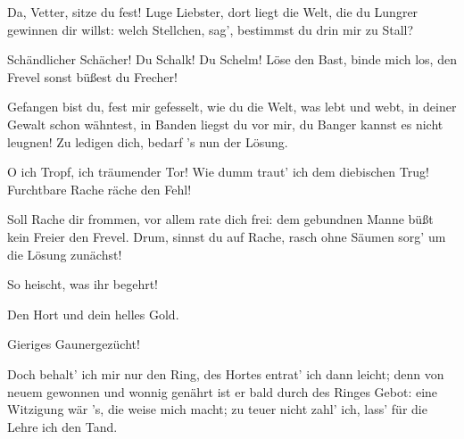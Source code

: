 \begin{drama}

\Logespeaks
Da, Vetter, sitze du fest!
Luge Liebster, dort liegt die Welt,
die du Lungrer gewinnen dir willst:
welch Stellchen, sag',
bestimmst du drin mir zu Stall?
 




\Alberichspeaks
Schändlicher Schächer! Du Schalk! Du Schelm!
Löse den Bast, binde mich los,
den Frevel sonst büßest du Frecher!
 

\Wotanspeaks
Gefangen bist du, fest mir gefesselt,
wie du die Welt, was lebt und webt,
in deiner Gewalt schon wähntest,
in Banden liegst du vor mir,
du Banger kannst es nicht leugnen!
Zu ledigen dich, bedarf 's nun der Lösung.
 

\Alberichspeaks
O ich Tropf, ich träumender Tor!
Wie dumm traut' ich dem diebischen Trug!
Furchtbare Rache räche den Fehl!
 

\Logespeaks
Soll Rache dir frommen,
vor allem rate dich frei:
dem gebundnen Manne
büßt kein Freier den Frevel.
Drum, sinnst du auf Rache,
rasch ohne Säumen
sorg' um die Lösung zunächst!
 




\Alberichspeaks


So heischt, was ihr begehrt!
 

\Wotanspeaks
Den Hort und dein helles Gold.
 

\Alberichspeaks
Gieriges Gaunergezücht!
 



Doch behalt' ich mir nur den Ring,
des Hortes entrat' ich dann leicht;
denn von neuem gewonnen
und wonnig genährt
ist er bald durch des Ringes Gebot:
eine Witzigung wär 's,
die weise mich macht;
zu teuer nicht zahl' ich,
lass' für die Lehre ich den Tand.
 


\end{drama}
